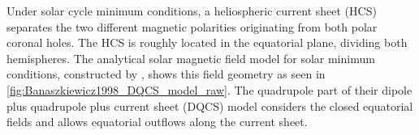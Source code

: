 Under solar cycle minimum conditions, a heliospheric current sheet (HCS) separates the two different magnetic polarities originating from both polar coronal holes. The HCS is roughly located in the equatorial plane, dividing both hemispheres. The analytical solar magnetic field model for solar minimum conditions, constructed by \citet{Banaszkiewicz1998}, shows this field geometry as seen in \autoref{fig:Banaszkiewicz1998_DQCS_model_raw}. The quadrupole part of their dipole plus quadrupole plus current sheet (DQCS) model considers the closed equatorial fields and allows equatorial outflows along the current sheet.
\begin{figure}[htb]
	\begin{floatrow}
\end{floatrow}
\end{figure}
